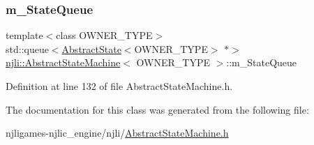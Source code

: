 \subsubsection{\texorpdfstring{m\+\_\+\+State\+Queue}{m\_StateQueue}}
{\footnotesize\ttfamily template$<$class O\+W\+N\+E\+R\+\_\+\+T\+Y\+PE$>$ \\
std\+::queue$<$\mbox{\hyperlink{classnjli_1_1_abstract_state}{Abstract\+State}}$<$O\+W\+N\+E\+R\+\_\+\+T\+Y\+PE$>$ $\ast$$>$ \mbox{\hyperlink{classnjli_1_1_abstract_state_machine}{njli\+::\+Abstract\+State\+Machine}}$<$ O\+W\+N\+E\+R\+\_\+\+T\+Y\+PE $>$\+::m\+\_\+\+State\+Queue\hspace{0.3cm}{\ttfamily [private]}}



Definition at line 132 of file Abstract\+State\+Machine.\+h.



The documentation for this class was generated from the following file\+:\begin{DoxyCompactItemize}
\item 
njligames-\/njlic\+\_\+engine/njli/\mbox{\hyperlink{_abstract_state_machine_8h}{Abstract\+State\+Machine.\+h}}\end{DoxyCompactItemize}
